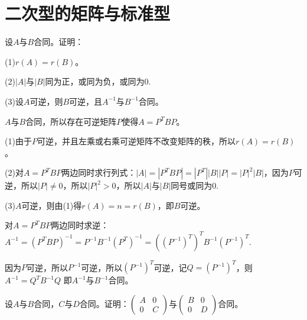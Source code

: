 \documentclass[a4paper]{report}
\begin{document}
\section{二次型的矩阵与标准型}
\EX 设$A$与$B$合同。证明：

(1)$r(A)=r(B)$。

(2)$|A|$与$|B|$同为正，或同为负，或同为0.

(3)设$A$可逆，则$B$可逆，且$A^{-1}$与$B^{-1}$合同。

\begin{zhengming}
$A$与$B$合同，所以存在可逆矩阵$P$使得$A=P^TBP$。

(1)由于$P$可逆，并且左乘或右乘可逆矩阵不改变矩阵的秩，所以$r(A)=r(B)$。

(2)对$A=P^TBP$两边同时求行列式：$|A|=|P^TBP|=|P^T||B||P|=|P|^2|B|$，因为$P$可逆，所以$|P|\neq 0$，所以$|P|^2>0$，所以$|A|$与$|B|$同号或同为0.

(3)$A$可逆，则由(1)得$r(A)=n=r(B)$，即$B$可逆。

对$A=P^TBP$两边同时求逆：$A^{-1}=(P^TBP)^{-1}=P^{-1}B^{-1}(P^{T})^{-1}=((P^{-1})^T)^TB^{-1}(P^{-1})^{T}$.

因为$P$可逆，所以$P^{-1}$可逆，所以$(P^{-1})^T$可逆，记$Q=(P^{-1})^T$，则$A^{-1}=Q^TB^{-1}Q$
即$A^{-1}$与$B^{-1}$合同。
\end{zhengming}

\EX 设$A$与$B$合同，$C$与$D$合同。证明：$
\begin{pmatrix}
A&0\\
0&C
\end{pmatrix}
$与$\begin{pmatrix}
B&0\\
0&D
\end{pmatrix}
$合同。
\end{document}
